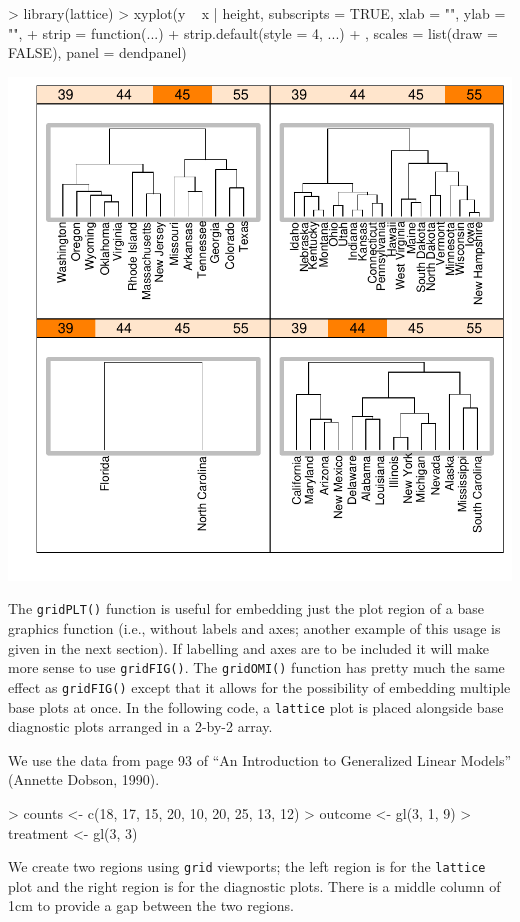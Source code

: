 \documentclass[a4paper]{article}
\newcommand{\grid}{{\tt grid}}
\newcommand{\lattice}{{\tt lattice}}
\begin{document}
\begin{Schunk}
\begin{Sinput}
> library(lattice)
> xyplot(y ~ x | height, subscripts = TRUE, xlab = "", ylab = "", 
+     strip = function(...) {
+         strip.default(style = 4, ...)
+     }, scales = list(draw = FALSE), panel = dendpanel)
\end{Sinput}
\end{Schunk}
\includegraphics{gridBase-014}

The \verb|gridPLT()| function is useful for embedding just the
plot region of a base graphics function (i.e., without labels and
axes;  another example of this usage 
is given in the next section).  If labelling
and axes are to be included it will make more sense to use
\verb|gridFIG()|.  The \verb|gridOMI()| function has pretty much
the same effect as \verb|gridFIG()| except that it allows for the
possibility of embedding multiple base plots at once.  In the
following code, a \lattice{} plot is placed alongside 
base diagnostic plots arranged in a 2-by-2 array.

We use the data from page 93 of
``An Introduction to Generalized Linear Models'' (Annette Dobson, 1990).

\begin{Schunk}
\begin{Sinput}
> counts <- c(18, 17, 15, 20, 10, 20, 25, 13, 12)
> outcome <- gl(3, 1, 9)
> treatment <- gl(3, 3)
\end{Sinput}
\end{Schunk}
We create two regions using \grid{} viewports;  the left region
is for the \lattice{} plot and the right region is for the diagnostic
plots.  There is a middle column of 1cm to provide a gap between
the two regions.
\end{document}

